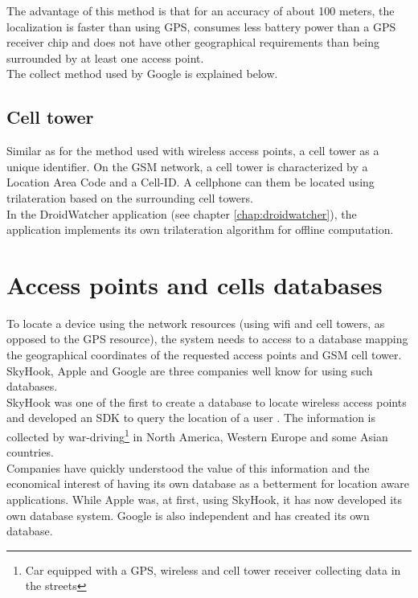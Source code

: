 The advantage of this method is that for an accuracy of about 100 meters, the localization is faster than using GPS, consumes less battery power than a GPS receiver chip and does not have other geographical requirements than being surrounded by at least one access point.\\

The collect method used by Google is explained below.

\subsection{Cell tower}
Similar as for the method used with wireless access points, a cell tower as a unique identifier.
On the GSM network, a cell tower is characterized by a Location Area Code and a Cell-ID.
A cellphone can them be located using trilateration based on the surrounding cell towers.\\

In the DroidWatcher application (see chapter \ref{chap:droidwatcher}), the application implements its own trilateration algorithm for offline computation.


\section{Access points and cells databases}
\label{sec:andro-cell-db}

To locate a device using the network resources (using wifi and cell towers, as opposed to the GPS resource), the system needs to access to a database mapping the geographical coordinates of the requested access points and GSM cell tower.
SkyHook, Apple and Google are three companies well know for using such databases.\\

SkyHook was one of the first to create a database to locate wireless access points and developed an SDK to query the location of a user .
The information is collected by war-driving\footnote{Car equipped with a GPS, wireless and cell tower receiver collecting data in the streets} in North America, Western Europe and some Asian countries\cite{skyhook-coverage}.\\

Companies have quickly understood the value of this information and the economical interest of having its own database as a betterment for location aware applications.
While Apple was, at first, using SkyHook, it has now developed its own database system.
Google is also independent and has created its own database.\\

